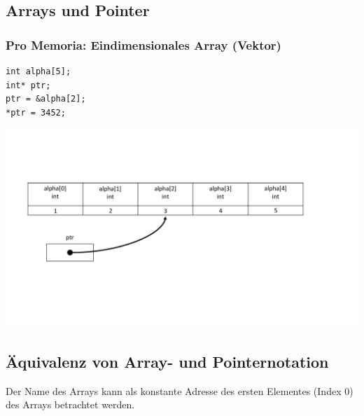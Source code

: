 \subsection{Arrays und Pointer}

\subsubsection{Pro Memoria: Eindimensionales Array (Vektor)}
\noindent
\begin{minipage}{0.2\linewidth}
\begin{lstlisting}
int alpha[5];
int* ptr;
ptr = &alpha[2];
*ptr = 3452;
\end{lstlisting}
\end{minipage}
\hspace{0.01\linewidth}
\begin{minipage}{0.75\linewidth}
	\includegraphics[width=\linewidth]{images/pointer9.pdf}
\end{minipage}

\subsection{Äquivalenz von Array- und Pointernotation}
\begin{minipage}{0.3\linewidth}
Der Name des Arrays kann als konstante Adresse des ersten Elementes (Index 0) des Arrays betrachtet werden.
\vfill\null
\end{minipage}%
\hspace{0.01\linewidth}
\begin{minipage}{0.65\linewidth}
	
\end{minipage}

